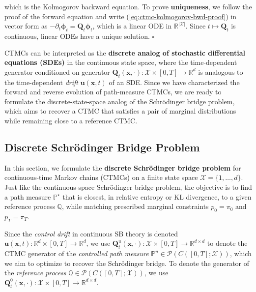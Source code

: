 \documentclass{article}
\newcommand{\boldtext}[1]{\textbf{\textcolor{MyGreen}{#1}}}
\begin{document}
which is the Kolmogorov backward equation. To prove \textbf{uniqueness}, we follow the proof of the forward equation and write (\ref{eq:ctmc-kolmogorov-bwd-proof}) in vector form as $-\partial_t\boldsymbol{\phi}_t=\boldsymbol{Q}_t\boldsymbol{\phi}_t$, which is a linear ODE in $\mathbb{R}^{|\mathcal{X}|}$. Since $t\mapsto \boldsymbol{Q}_t$ is continuous, linear ODEs have a unique solution. \hfill $\square$

CTMCs can be interpreted as the \textbf{discrete analog of stochastic differential equations (SDEs)} in the continuous state space, where the time-dependent generator conditioned on generator $\boldsymbol{Q}_t(\boldsymbol{x}, \cdot):\mathcal{X}\times[0,T]\to \mathbb{R}^d$ is analogous to the time-dependent \textit{drift} $\boldsymbol{u}(\boldsymbol{x},t)$ of an SDE. Since we have characterized the forward and reverse evolution of path-measure CTMCs, we are ready to formulate the discrete-state-space analog of the Schrödinger bridge problem, which aims to recover a CTMC that satisfies a pair of marginal distributions while remaining close to a reference CTMC.

\subsection{Discrete Schrödinger Bridge Problem}
\label{subsec:discrete-sbp}
In this section, we formulate the \boldtext{discrete Schrödinger bridge problem} for continuous-time Markov chains (CTMCs) on a finite state space $\mathcal{X}=\{1, \dots , d\}$. Just like the continuous-space Schrödinger bridge problem, the objective is to find a path measure $\mathbb{P}^\star$ that is closest, in relative entropy or KL divergence, to a given reference process $\mathbb{Q}$, while matching prescribed marginal constraints $p_0=\pi_0$ and $p_T=\pi_T$. 

Since the \textit{control drift} in continuous SB theory is denoted $\boldsymbol{u}(\boldsymbol{x},t):\mathbb{R}^d\times[0,T]\to\mathbb{R}^d$, we use $\boldsymbol{Q}^u_t(\boldsymbol{x}, \cdot):\mathcal{X}\times[0,T]\to \mathbb{R}^{d\times d}$ to denote the CTMC generator of the \textit{controlled path measure} $\mathbb{P}^u\in \mathcal{P}(C([0,T]; \mathcal{X}))$, which we aim to optimize to recover the Schrödinger bridge. To denote the generator of the \textit{reference process} $\mathbb{Q}\in \mathcal{P}(C([0,T]; \mathcal{X}))$, we use $\boldsymbol{Q}^0_t(\boldsymbol{x}, \cdot):\mathcal{X}\times[0,T]\to \mathbb{R}^{d\times d}$. 
\end{document}
